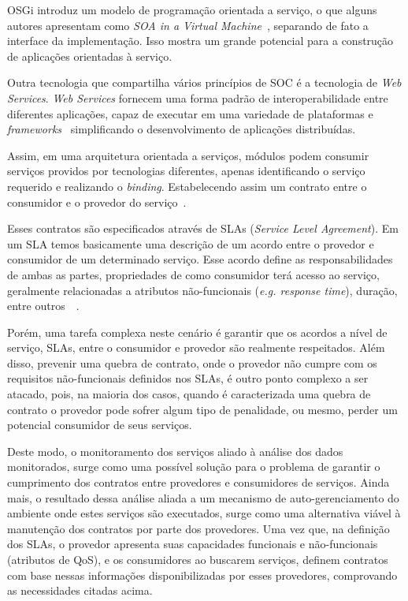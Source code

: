 OSGi introduz um modelo de programação orientada a serviço, o que alguns autores apresentam como \textit{SOA in a Virtual Machine}~\cite{hall2010osgi}, separando de fato a interface da implementação. Isso mostra um grande potencial para a construção de aplicações orientadas à serviço.

Outra tecnologia que compartilha vários princípios de SOC é a tecnologia de \textit{Web Services}. \textit{Web Services} fornecem uma forma padrão de interoperabilidade entre diferentes aplicações, capaz de executar em uma variedade de plataformas e \textit{frameworks}~\cite{w3c2002ws} simplificando o desenvolvimento de aplicações distribuídas.

Assim, em uma arquitetura orientada a serviços, módulos podem consumir serviços providos por tecnologias diferentes, apenas identificando o serviço requerido e realizando o \textit{binding}. Estabelecendo assim um contrato entre o consumidor e o provedor do serviço~\cite{oracle2005ws}.

Esses contratos são especificados através de SLAs (\textit{Service Level Agreement}). Em um SLA temos basicamente uma descrição de um acordo entre o provedor e consumidor de um determinado serviço. Esse acordo define as responsabilidades de ambas as partes, propriedades de como consumidor terá acesso ao serviço, geralmente relacionadas a atributos não-funcionais (\textit{e.g. response time}), duração, entre outros~\cite{jin2002analysis}~\cite{slasoi}.

Porém, uma tarefa complexa neste cenário é garantir que os acordos a nível de serviço, SLAs, entre o consumidor e provedor são realmente respeitados. Além disso, prevenir uma quebra de contrato, onde o provedor não cumpre com os requisitos não-funcionais definidos nos SLAs, é outro ponto complexo a ser atacado, pois, na maioria dos casos, quando é caracterizada uma quebra de contrato o provedor pode sofrer algum tipo de penalidade, ou mesmo, perder um potencial consumidor de seus serviços.

Deste modo, o monitoramento dos serviços aliado à análise dos dados monitorados, surge como uma possível solução para o problema de garantir o cumprimento dos contratos entre provedores e consumidores de serviços. Ainda mais, o resultado dessa análise aliada a um mecanismo de auto-gerenciamento do ambiente onde estes serviços são executados, surge como uma alternativa viável à manutenção dos contratos por parte dos provedores. Uma vez que, na definição dos SLAs, o provedor apresenta suas capacidades funcionais e não-funcionais (atributos de QoS), e os consumidores ao buscarem serviços, definem contratos com base nessas informações disponibilizadas por esses provedores, comprovando as necessidades citadas acima.

